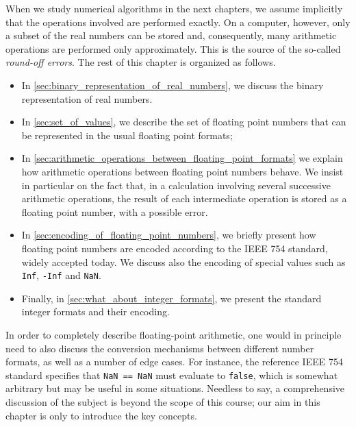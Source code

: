 When we study numerical algorithms in the next chapters,
we assume implicitly that the operations involved are performed exactly.
On a computer, however, only a subset of the real numbers can be stored and,
consequently, many arithmetic operations are performed only approximately.
This is the source of the so-called \emph{round-off errors}.
The rest of this chapter is organized as follows.
\begin{itemize}
    \item
        In \cref{sec:binary_representation_of_real_numbers},
        we discuss the binary representation of real numbers.

    \item
        In \cref{sec:set_of_values},
        we describe the set of floating point numbers that can be represented in the usual floating point formats;

    \item
        In \cref{sec:arithmetic_operations_between_floating_point_formats}
        we explain how arithmetic operations between floating point numbers behave.
        We insist in particular on the fact that,
        in a calculation involving several successive arithmetic operations,
        the result of each intermediate operation is stored as a floating point number,
        with a possible error.

    \item
        In \cref{sec:encoding_of_floating_point_numbers},
        we briefly present how floating point numbers are encoded
        according to the IEEE 754 standard, widely accepted today.
        We discuss also the encoding of special values such as \texttt{Inf}, \texttt{-Inf} and \texttt{NaN}.

    \item
        Finally, in \cref{sec:what_about_integer_formats},
        we present the standard integer formats and their encoding.
\end{itemize}
In order to completely describe floating-point arithmetic,
one would in principle need to also discuss the conversion mechanisms between different number formats,
as well as a number of edge cases.
For instance, the reference IEEE 754 standard specifies that \texttt{NaN == NaN} must evaluate to \texttt{false},
which is somewhat arbitrary but may be useful in some situations.
Needless to say,
a comprehensive discussion of the subject is beyond the scope of this course;
our aim in this chapter is only to introduce the key concepts.

